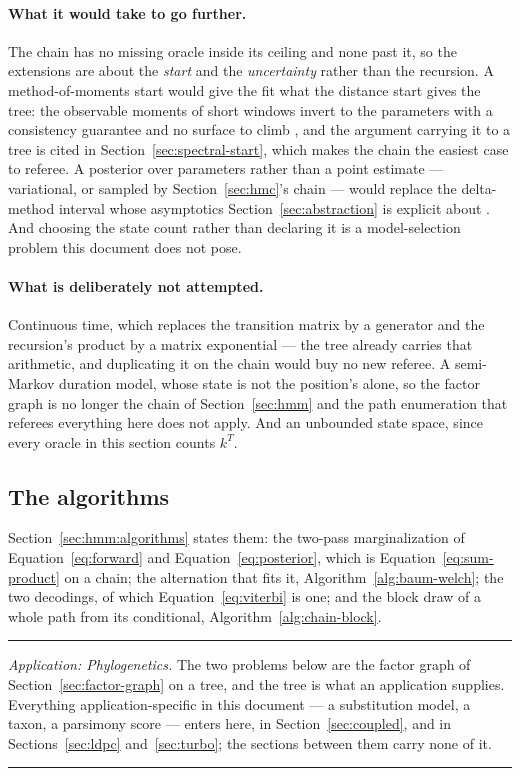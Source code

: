\documentclass[11pt,a4paper]{article}
\begin{document}
\paragraph{What it would take to go further.}
The chain has no missing oracle inside its ceiling and none past it, so the
extensions are about the \emph{start} and the \emph{uncertainty} rather than
the recursion. A method-of-moments start would give the fit what the distance
start gives the tree: the observable moments of short windows invert to the
parameters with a consistency guarantee and no surface to climb
\citep{hsu2012}, and the argument carrying it to a tree \citep{mossel2006} is
cited in Section~\ref{sec:spectral-start}, which makes the chain the easiest
case to referee. A posterior over parameters rather than a point estimate ---
variational, or sampled by Section~\ref{sec:hmc}'s chain --- would replace the
delta-method interval whose asymptotics Section~\ref{sec:abstraction} is
explicit about \citep{bishop2006, murphy2023}. And choosing the state count
rather than declaring it is a model-selection problem this document does not
pose.

\paragraph{What is deliberately not attempted.}
Continuous time, which replaces the transition matrix by a generator and the
recursion's product by a matrix exponential --- the tree already carries that
arithmetic, and duplicating it on the chain would buy no new referee. A
semi-Markov duration model, whose state is not the position's alone, so the
factor graph is no longer the chain of Section~\ref{sec:hmm} and the path
enumeration that referees everything here does not apply. And an unbounded
state space, since every oracle in this section counts $k^T$.

\subsection{The algorithms}
Section~\ref{sec:hmm:algorithms} states them: the two-pass
marginalization of Equation~\ref{eq:forward} and Equation~\ref{eq:posterior},
which is Equation~\ref{eq:sum-product} on a chain; the alternation that fits
it, Algorithm~\ref{alg:baum-welch}; the two decodings, of which
Equation~\ref{eq:viterbi} is one; and the block draw of a whole path from its
conditional, Algorithm~\ref{alg:chain-block}.

\begin{center}\rule{0.45\linewidth}{0.4pt}\end{center}
\noindent\textit{Application: Phylogenetics.} The two problems below are the factor graph of
Section~\ref{sec:factor-graph} on a tree, and the tree is what an application
supplies. Everything application-specific in this document --- a substitution
model, a taxon, a parsimony score --- enters here, in
Section~\ref{sec:coupled}, and in Sections~\ref{sec:ldpc}
and~\ref{sec:turbo}; the sections between them carry none of it.
\begin{center}\rule{0.45\linewidth}{0.4pt}\end{center}
\end{document}

